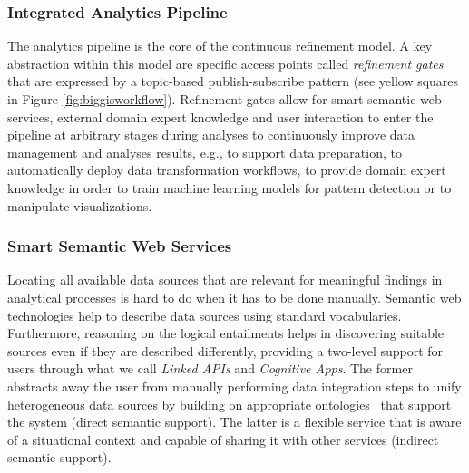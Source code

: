 \documentclass{sig-alternate-05-2015}
\begin{document}
\subsubsection{Integrated Analytics Pipeline}
The analytics pipeline is the core of the continuous refinement model. A key
abstraction within this model are specific access points called
\textit{refinement gates} that are expressed by a topic-based publish-subscribe
pattern (see yellow squares in Figure \ref{fig:biggisworkflow}).
Refinement gates allow for smart semantic web services, external domain expert
knowledge and user interaction to enter the pipeline at arbitrary stages during
analyses to continuously improve data management and analyses results, e.g., to
support data preparation, to automatically deploy data transformation
workflows, to provide domain expert knowledge in order to train machine
learning models for pattern detection or to manipulate visualizations. 

\subsubsection{Smart Semantic Web Services}
Locating all available data sources that are relevant for meaningful findings
in analytical processes is hard to do when it has to be done manually. Semantic
web technologies help to describe data sources using standard vocabularies.
Furthermore, reasoning on the logical entailments helps in discovering suitable
sources even if they are described differently, providing a two-level support
for users through what we call \textit{Linked APIs} and \textit{Cognitive
Apps}. The former abstracts away the user from manually performing data
integration steps to unify heterogeneous data sources by building on
appropriate ontologies~\cite{Frank.2016b} that support the system (direct
semantic support). The latter is a flexible service that is aware of a
situational context and capable of sharing it with other services (indirect
semantic support).
\end{document}
